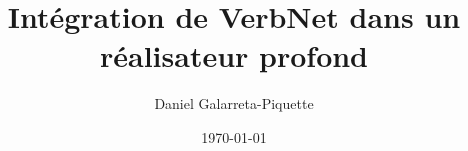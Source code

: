 

\title{Intégration de VerbNet dans un réalisateur profond}
\author{Daniel Galarreta-Piquette}
\date{\today}									%




\maketitle    
 
